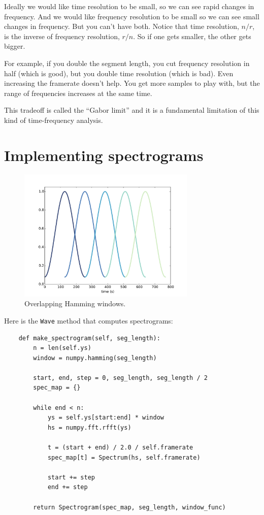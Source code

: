 \documentclass[12pt]{book}
\begin{document}
Ideally we would like time resolution to be small, so we can see rapid
changes in frequency.  And we would like frequency resolution to be
small so we can see small changes in frequency.  But you can't have
both.  Notice that time resolution, $n/r$, is the inverse of frequency
resolution, $r/n$.  So if one gets smaller, the other gets bigger.

For example, if you double the segment length, you cut frequency
resolution in half (which is good), but you double time resolution
(which is bad).  Even increasing the framerate doesn't help.  You get
more samples to play with, but the range of frequencies increases at
the same time.

This tradeoff is called the ``Gabor limit'' and it is a fundamental
limitation of this kind of time-frequency analysis.


\section{Implementing spectrograms}

\begin{figure}
\centerline{\includegraphics[height=2.5in]{figs/windowing3.pdf}}
\caption{Overlapping Hamming windows.}
\label{fig.windowing3}
\end{figure}

Here is the {\tt Wave} method that computes spectrograms:

\begin{verbatim}
    def make_spectrogram(self, seg_length):
        n = len(self.ys)
        window = numpy.hamming(seg_length)

        start, end, step = 0, seg_length, seg_length / 2
        spec_map = {}

        while end < n:
            ys = self.ys[start:end] * window
            hs = numpy.fft.rfft(ys)

            t = (start + end) / 2.0 / self.framerate
            spec_map[t] = Spectrum(hs, self.framerate)

            start += step
            end += step

        return Spectrogram(spec_map, seg_length, window_func)
\end{verbatim}
\end{document}
